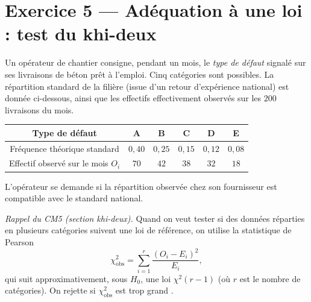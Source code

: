 \vspace{0.8cm}

\section*{Exercice 5 --- Adéquation à une loi : test du khi-deux}

Un opérateur de chantier consigne, pendant un mois, le \emph{type de défaut} signalé sur ses livraisons de béton prêt à l'emploi. Cinq catégories sont possibles. La répartition \og standard \fg{} de la filière (issue d'un retour d'expérience national) est donnée ci-dessous, ainsi que les effectifs effectivement observés sur les $200$ livraisons du mois.

\begin{center}
\renewcommand{\arraystretch}{1.3}
\begin{tabular}{|c|c|c|c|c|c|}
  \hline
  Type de défaut & A & B & C & D & E \\
  \hline
  Fréquence théorique standard & $0{,}40$ & $0{,}25$ & $0{,}15$ & $0{,}12$ & $0{,}08$ \\
  \hline
  Effectif observé sur le mois $O_i$ & $70$ & $42$ & $38$ & $32$ & $18$ \\
  \hline
\end{tabular}
\end{center}

L'opérateur se demande si la répartition observée chez son fournisseur est compatible avec le standard national.

\smallskip

\textit{Rappel du CM5 (section khi-deux).} Quand on veut tester si des données réparties en plusieurs catégories suivent une loi de référence, on utilise la statistique de Pearson
\[
  \chi^2_{\text{obs}} = \sum_{i=1}^{r} \dfrac{(O_i - E_i)^2}{E_i},
\]
qui suit approximativement, sous $H_0$, une loi $\chi^2(r-1)$ (où $r$ est le nombre de catégories). On rejette si $\chi^2_{\text{obs}}$ est \og trop grand \fg.

